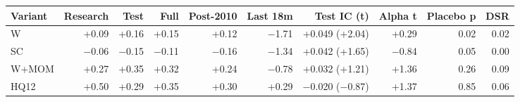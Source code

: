 \begin{tabular}{lrrrrrrrrr}
\toprule
Variant & Research & Test & Full & Post-2010 & Last 18m & Test IC (t) & Alpha t & Placebo p & DSR \\
\midrule
W & +0.09 & +0.16 & +0.15 & +0.12 & $-$1.71 & +0.049 (+2.04) & +0.29 & 0.02 & 0.02 \\
SC & $-$0.06 & $-$0.15 & $-$0.11 & $-$0.16 & $-$1.34 & +0.042 (+1.65) & $-$0.84 & 0.05 & 0.00 \\
W+MOM & +0.27 & +0.35 & +0.32 & +0.24 & $-$0.78 & +0.032 (+1.21) & +1.36 & 0.26 & 0.09 \\
HQ12 & +0.50 & +0.29 & +0.35 & +0.30 & +0.29 & $-$0.020 ($-$0.87) & +1.37 & 0.85 & 0.06 \\
\bottomrule
\end{tabular}
